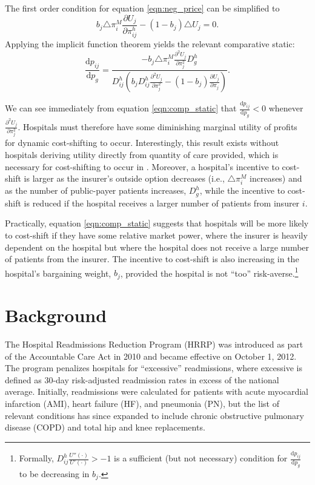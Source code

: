 \documentclass[12pt]{article}
\newcommand{\deriv}[2]{\frac{\mathrm{d}#1}{\mathrm{d}#2}}
\newcommand{\pderiv}[2]{\frac{\partial#1}{\partial#2}}
\begin{document}
The first order condition for equation \ref{eqn:neg_price} can be simplified to
\begin{equation}
 b_{j} \triangle \pi_{i}^{M} \pderiv{U_{j}}{\pi_{ij}^{h}} - (1-b_{j}) \triangle U_{j} = 0.
\label{eqn:price_foc}
\end{equation}
Applying the implicit function theorem yields the relevant comparative static:
\begin{equation}
\deriv{p_{ij}}{p_{g}} = \frac{- b_{j} \triangle \pi_{i}^{M} \pderiv{^{2}U_{j}}{\pi_{j}^{2}}D_{g}^{h}}{D_{ij}^{h}\left(b_{j} D_{ij}^{h} \pderiv{^{2}U_{j}}{\pi_{j}^{2}} - (1-b_{j}) \pderiv{U_{j}}{\pi_{j}} \right)}.
\label{eqn:comp_static}
\end{equation}

We can see immediately from equation \ref{eqn:comp_static} that $\deriv{p_{ij}}{p_{g}}<0$ whenever $\pderiv{^{2}U_{j}}{\pi_{j}^{2}}$. Hospitals must therefore have some diminishing marginal utility of profits for dynamic cost-shifting to occur. Interestingly, this result exists without hospitals deriving utility directly from quantity of care provided, which is necessary for cost-shifting to occur in \cite{dranove1988}. Moreover, a hospital's incentive to cost-shift is larger as the insurer's outside option decreases (i.e., $\triangle \pi_{i}^{M}$ increases) and as the number of public-payer patients increases, $D_{g}^{h}$, while the incentive to cost-shift is reduced if the hospital receives a larger number of patients from insurer $i$.

Practically, equation \ref{eqn:comp_static} suggests that hospitals will be more likely to cost-shift if they have some relative market power, where the insurer is heavily dependent on the hospital but where the hospital does not receive a large number of patients from the insurer. The incentive to cost-shift is also increasing in the hospital's bargaining weight, $b_{j}$, provided the hospital is not ``too'' risk-averse.\footnote{Formally, $D_{ij}^{h}\frac{U''(\cdot)}{U'(\cdot)}>-1$ is a sufficient (but not necessary) condition for $\deriv{p_{ij}}{p_{g}}$ to be decreasing in $b_{j}$.}

\section{Background}
\label{sec:hrrp}
The Hospital Readmissions Reduction Program (HRRP) was introduced as part of the Accountable Care Act in 2010 and became effective on October 1, 2012. The program penalizes hospitals for ``excessive'' readmissions, where excessive is defined as 30-day risk-adjusted readmission rates in excess of the national average. Initially, readmissions were calculated for patients with acute myocardial infarction (AMI), heart failure (HF), and pneumonia (PN), but the list of relevant conditions has since expanded to include chronic obstructive pulmonary disease (COPD) and total hip and knee replacements.
\end{document}
